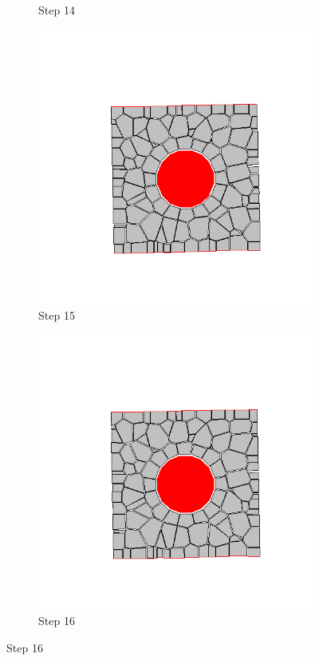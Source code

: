 \begin{figure}[ht!]
\begin{subfigure}{.25\textwidth}
      \caption{Step 14}
      \end{subfigure}%
      \begin{subfigure}{.25\textwidth}
        \centering
        \includegraphics[width=1.0\linewidth]{Files/Small_DEF/CR/DEP5-STEP(015).png}
      \caption{Step 15}
      \end{subfigure}%
      \begin{subfigure}{.25\textwidth}
        \centering
        \includegraphics[width=1.0\linewidth]{Files/Small_DEF/CR/DEP5-STEP(016).png}
      \caption{Step 16}
      \end{subfigure}


\end{figure}
